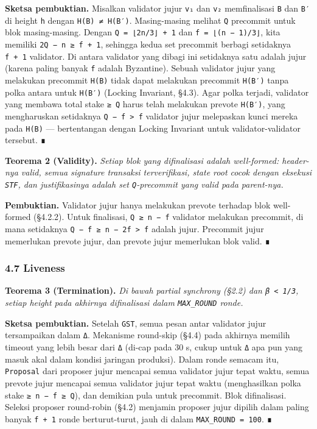 \documentclass[11pt,a4paper]{article}
\begin{document}
\textbf{Sketsa pembuktian.} Misalkan validator jujur \texttt{v₁} dan \texttt{v₂} memfinalisasi \texttt{B} dan \texttt{B′} di height \texttt{h} dengan \texttt{H(B)\ ≠\ H(B′)}. Masing-masing melihat \texttt{Q} precommit untuk blok masing-masing. Dengan \texttt{Q\ =\ ⌊2n/3⌋\ +\ 1} dan \texttt{f\ =\ ⌊(n\ −\ 1)/3⌋}, kita memiliki \texttt{2Q\ −\ n\ ≥\ f\ +\ 1}, sehingga kedua set precommit berbagi setidaknya \texttt{f\ +\ 1} validator. Di antara validator yang dibagi ini setidaknya satu adalah jujur (karena paling banyak \texttt{f} adalah Byzantine). Sebuah validator jujur yang melakukan precommit \texttt{H(B)} tidak dapat melakukan precommit \texttt{H(B′)} tanpa polka antara untuk \texttt{H(B′)} (Locking Invariant, §4.3). Agar polka terjadi, validator yang membawa total stake \texttt{≥\ Q} harus telah melakukan prevote \texttt{H(B′)}, yang mengharuskan setidaknya \texttt{Q\ −\ f\ \textgreater{}\ f} validator jujur melepaskan kunci mereka pada \texttt{H(B)} --- bertentangan dengan Locking Invariant untuk validator-validator tersebut. ∎

\textbf{Teorema 2 (Validity).} \emph{Setiap blok yang difinalisasi adalah well-formed: header-nya valid, semua signature transaksi terverifikasi, state root cocok dengan eksekusi \texttt{STF}, dan justifikasinya adalah set \texttt{Q}-precommit yang valid pada parent-nya.}

\textbf{Pembuktian.} Validator jujur hanya melakukan prevote terhadap blok well-formed (§4.2.2). Untuk finalisasi, \texttt{Q\ ≥\ n\ −\ f} validator melakukan precommit, di mana setidaknya \texttt{Q\ −\ f\ ≥\ n\ −\ 2f\ \textgreater{}\ f} adalah jujur. Precommit jujur memerlukan prevote jujur, dan prevote jujur memerlukan blok valid. ∎

\hypertarget{liveness}{%
\subsubsection{4.7 Liveness}\label{liveness}}

\textbf{Teorema 3 (Termination).} \emph{Di bawah partial synchrony (§2.2) dan \texttt{β\ \textless{}\ 1/3}, setiap height pada akhirnya difinalisasi dalam \texttt{MAX\_ROUND} ronde.}

\textbf{Sketsa pembuktian.} Setelah \texttt{GST}, semua pesan antar validator jujur tersampaikan dalam \texttt{Δ}. Mekanisme round-skip (§4.4) pada akhirnya memilih timeout yang lebih besar dari \texttt{Δ} (di-cap pada 30 s, cukup untuk \texttt{Δ} apa pun yang masuk akal dalam kondisi jaringan produksi). Dalam ronde semacam itu, \texttt{Proposal} dari proposer jujur mencapai semua validator jujur tepat waktu, semua prevote jujur mencapai semua validator jujur tepat waktu (menghasilkan polka stake \texttt{≥\ n\ −\ f\ ≥\ Q}), dan demikian pula untuk precommit. Blok difinalisasi. Seleksi proposer round-robin (§4.2) menjamin proposer jujur dipilih dalam paling banyak \texttt{f\ +\ 1} ronde berturut-turut, jauh di dalam \texttt{MAX\_ROUND\ =\ 100}. ∎
\end{document}
